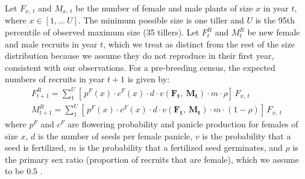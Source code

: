 \documentclass[12pt]{article}\usepackage[]{graphicx}\usepackage[dvipsnames]{xcolor}
\begin{document}
Let $F_{x,\ t}$ and $M_{x,\ t}$ be the number of female and male plants of size $x$ in year $t$, where $x \in [1,...\ U]$.
The minimum possible size is one tiller and $U$ is the 95th percentile of observed maximum size (35 tillers).
Let $F^{R}_{t}$ and $M^{R}_{t}$ be new female and male recruits in year $t$, which we treat as distinct from the rest of the size distribution because we assume they do not reproduce in their first year, consistent with our observations.
For a pre-breeding census, the expected numbers of recruits in year $t+1$ is given by:
\begin{align}\label{eq:recruits}
F^{R}_{t+1} = \sum_{1}^{U} 	[ \, p^{F}(x) \cdot c^{F}(x) \cdot d \cdot v(\mathbf{F_{t}},\ \mathbf{M_{t}}) \cdot m \cdot \rho 	] \, F_{x,\ t}
\\
M^{R}_{t+1} = \sum_{1}^{U} 	[ \, p^{F}(x) \cdot c^{F}(x) \cdot d \cdot v(\mathbf{F_{t}},\ \mathbf{M_{t}}) \cdot m \cdot (1-\rho) 	] \, F_{x,\ t}
\end{align}
\noindent where $p^{F}$ and $c^{F}$ are flowering probability and panicle production for females of size $x$, $d$ is the number of seeds per female panicle, $v$ is the probability that a seed is fertilized, $m$ is the probability that a fertilized seed germinates, and $\rho$ is the primary sex ratio (proportion of recruits that are female), which we assume to be $0.5$ \citep{miller2022two}. 
\end{document}
